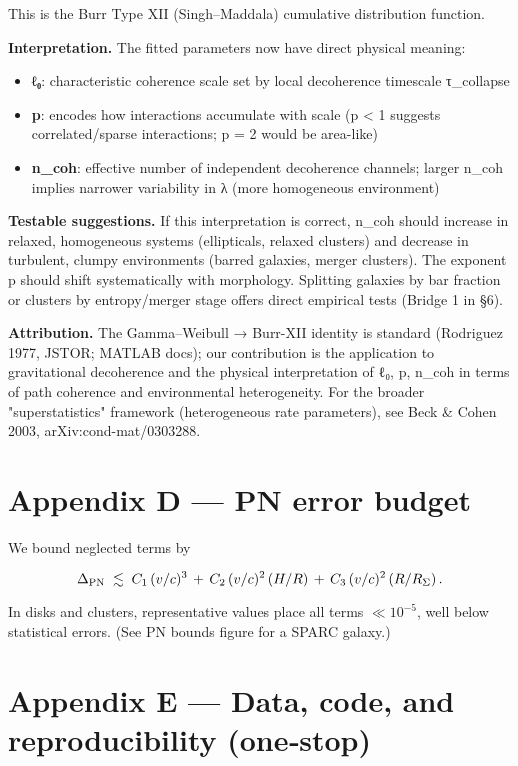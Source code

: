\documentclass[11pt,a4paper]{article}
\begin{document}
This is the Burr Type XII (Singh–Maddala) cumulative distribution function.


\textbf{Interpretation.} The fitted parameters now have direct physical meaning:  

\begin{itemize}
\item \textbf{ℓ₀}: characteristic coherence scale set by local decoherence timescale τ\_collapse
\item \textbf{p}: encodes how interactions accumulate with scale (p < 1 suggests correlated/sparse interactions; p = 2 would be area-like)
\item \textbf{n\_coh}: effective number of independent decoherence channels; larger n\_coh implies narrower variability in λ (more homogeneous environment)
\end{itemize}


\textbf{Testable suggestions.} If this interpretation is correct, n\_coh should increase in relaxed, homogeneous systems (ellipticals, relaxed clusters) and decrease in turbulent, clumpy environments (barred galaxies, merger clusters). The exponent p should shift systematically with morphology. Splitting galaxies by bar fraction or clusters by entropy/merger stage offers direct empirical tests (Bridge 1 in §6).


\textbf{Attribution.} The Gamma–Weibull → Burr-XII identity is standard (Rodriguez 1977, JSTOR; MATLAB docs); our contribution is the application to gravitational decoherence and the physical interpretation of {ℓ₀, p, n\_coh} in terms of path coherence and environmental heterogeneity. For the broader "superstatistics" framework (heterogeneous rate parameters), see Beck \& Cohen 2003, arXiv:cond-mat/0303288.


\section{Appendix D — PN error budget}


We bound neglected terms by


\begin{equation}
\Delta_{\rm PN} \;\lesssim\; C_1\,(v/c)^3 \, + \, C_2\,(v/c)^2\,(H/R) \, + \, C_3\,(v/c)^2\,(R/R_\Sigma)\,.
\end{equation}


In disks and clusters, representative values place all terms $\ll10^{-5}$, well below statistical errors. (See PN bounds figure for a SPARC galaxy.)


\section{Appendix E — Data, code, and reproducibility (one‑stop)}
\end{document}
